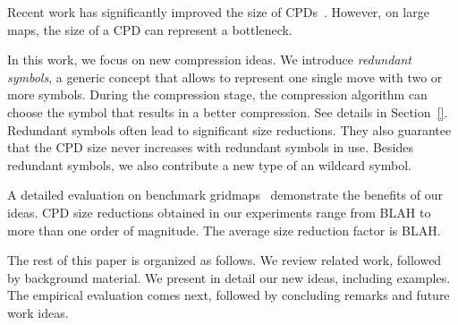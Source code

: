 Recent work has significantly improved the size of CPDs~\cite{strasser-et-al-2014,DBLP:conf/aips/SalvettiBSG17}. However, on large maps, the size of a CPD can represent a bottleneck.

In this work, we focus on new compression ideas. We introduce \emph{redundant symbols}, a generic concept that allows to represent one single move with two or more symbols. During the compression stage, the compression algorithm can choose the symbol that results in a better compression. See details in Section~\ref{}. Redundant symbols often lead to significant size reductions. They also guarantee that the CPD size never increases with redundant symbols in use. Besides redundant symbols, we also contribute a new type of an wildcard symbol. \citeauthor{DBLP:conf/aips/SalvettiBSG17}~


A detailed evaluation on benchmark gridmaps~\cite{s-bgbp-12} demonstrate the benefits of our ideas.
CPD size reductions obtained in our experiments range from BLAH to more than one order of magnitude. The average size reduction factor is BLAH.

The rest of this paper is organized as follows.
We review related work, followed by background material.
We present in detail our new ideas, including examples.
The empirical evaluation comes next, followed by concluding remarks and future work ideas.


